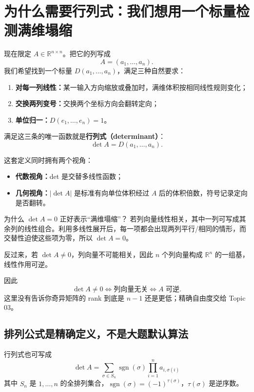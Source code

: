 \documentclass[11pt,a4paper]{ctexart}
\newcommand{\kw}[1]{\textbf{\color{deep}#1}}
\begin{document}
\section{为什么需要行列式：我们想用一个标量检测满维塌缩}

现在限定 $A\in\mathbb R^{n\times n}$。把它的列写成
\[
A=(a_1,\dots,a_n).
\]
我们希望找到一个标量 $D(a_1,\dots,a_n)$，满足三种自然要求：

\begin{enumerate}
  \item \kw{对每一列线性：}某一输入方向缩放或叠加时，满维体积按相同线性规则变化；
  \item \kw{交换两列变号：}交换两个坐标方向会翻转定向；
  \item \kw{单位归一：}$D(e_1,\dots,e_n)=1$。
\end{enumerate}

满足这三条的唯一函数就是\kw{行列式（determinant）}：
\[
\det A=D(a_1,\dots,a_n).
\]

这套定义同时拥有两个视角：
\begin{itemize}
  \item \kw{代数视角：}det 是交替多线性函数；
  \item \kw{几何视角：}$\lvert\det A\rvert$ 是标准有向单位体积经过 $A$ 后的体积倍数，符号记录定向是否翻转。
\end{itemize}

\begin{methodbox}{为什么 $\det A=0$ 正好表示“满维塌缩”？}
若列向量线性相关，其中一列可写成其余列的线性组合。利用多线性展开后，每一项都会出现两列平行/相同的情形，而交替性迫使这些项为零，所以 $\det A=0$。

反过来，若 $\det A\neq0$，列向量不可能相关，因此 $n$ 个列向量构成 $\mathbb R^n$ 的一组基，线性作用可逆。

因此
\[
\boxed{\det A\neq0\iff \text{列向量无关}\iff A\text{ 可逆}.}
\]
这里没有告诉你奇异矩阵的 rank 到底是 $n-1$ 还是更低；精确自由度交给 Topic 03。
\end{methodbox}

\subsection{排列公式是精确定义，不是大题默认算法}

行列式也可写成
\[
\boxed{
\det A=\sum_{\sigma\in S_n}\operatorname{sgn}(\sigma)
\prod_{i=1}^{n}a_{i,\sigma(i)}
}
\]
其中 $S_n$ 是 $1,\dots,n$ 的全排列集合，$\operatorname{sgn}(\sigma)=(-1)^{\tau(\sigma)}$，$\tau(\sigma)$ 是逆序数。
\end{document}
